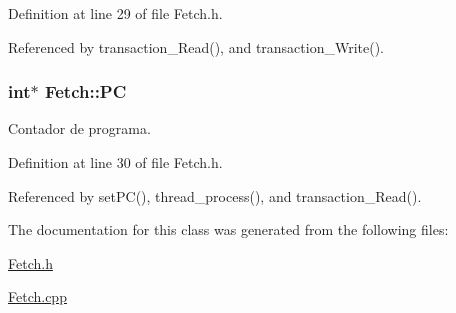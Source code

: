 Definition at line 29 of file Fetch.\+h.



Referenced by transaction\+\_\+\+Read(), and transaction\+\_\+\+Write().

\hypertarget{classFetch_a843f7a6498d7c4049751f8e7267f6609}{
\subsubsection[{P\+C}]{\setlength{\rightskip}{0pt plus 5cm}int$\ast$ Fetch\+::\+P\+C\hspace{0.3cm}{\ttfamily [private]}}}\label{classFetch_a843f7a6498d7c4049751f8e7267f6609}
Contador de programa. 

Definition at line 30 of file Fetch.\+h.



Referenced by set\+P\+C(), thread\+\_\+process(), and transaction\+\_\+\+Read().



The documentation for this class was generated from the following files\+:\begin{DoxyCompactItemize}
\item 
\hyperlink{Fetch_8h}{Fetch.\+h}\item 
\hyperlink{Fetch_8cpp}{Fetch.\+cpp}\end{DoxyCompactItemize}
